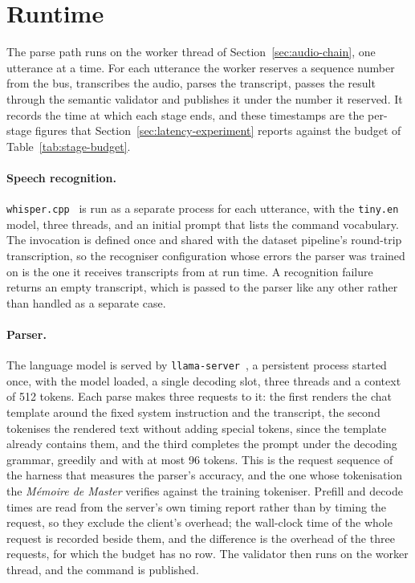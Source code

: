 \section{Runtime}
\label{sec:runtime}
The parse path runs on the worker thread of Section~\ref{sec:audio-chain}, one utterance at a
time. For each utterance the worker reserves a sequence number from the bus, transcribes the audio,
parses the transcript, passes the result through the semantic validator and publishes it under the
number it reserved. It records the time at which each stage ends, and these timestamps are the
per-stage figures that Section~\ref{sec:latency-experiment} reports against the budget of
Table~\ref{tab:stage-budget}.

\paragraph{Speech recognition.} \texttt{whisper.cpp}~\cite{whispercpp} is run as a separate process
for each utterance, with the \texttt{tiny.en} model, three threads, and an initial prompt that lists
the command vocabulary. The invocation is defined once and shared with the dataset pipeline's
round-trip transcription, so the recogniser configuration whose errors the parser was trained on is
the one it receives transcripts from at run time. A recognition failure returns an empty
transcript, which is passed to the parser like any other rather than handled as a separate case.

\paragraph{Parser.} The language model is served by \texttt{llama-server}~\cite{llamacpp}, a
persistent process started once, with the model loaded, a single decoding slot, three threads and a
context of 512 tokens. Each parse makes three requests to it: the first renders the chat template
around the fixed system instruction and the transcript, the second tokenises the rendered text
without adding special tokens, since the template already contains them, and the third completes
the prompt under the decoding grammar, greedily and with at most 96 tokens. This is the request
sequence of the harness that measures the parser's accuracy, and the one whose tokenisation the
\emph{M\'emoire de Master} verifies against the training tokeniser. Prefill and decode times are
read from the server's own timing report rather than by timing the request, so they exclude the
client's overhead; the wall-clock time of the whole request is recorded beside them, and the
difference is the overhead of the three requests, for which the budget has no row. The validator
then runs on the worker thread, and the command is published.

